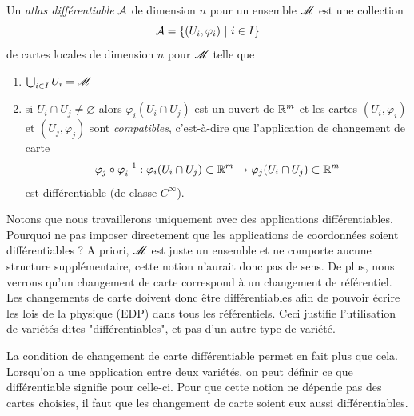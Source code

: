 \documentclass[a4paper,11pt]{report}
\begin{document}
            \begin{definition}
                Un \textit{atlas différentiable} $\mathcal{A}$ de dimension $n$ pour un ensemble $\mathscr{M}$ est une collection 
                \begin{equation}
                    \mathcal{A} = \left\{ (U_i,\varphi_i)~|~i\in I \right\}
                \end{equation}
                de cartes locales de dimension $n$ pour $\mathscr{M}$ telle que
                \begin{enumerate}[label=\textit{(\roman*)}]
                    \item $\bigcup_{i\in I} U_i = \mathscr{M}$
                    \item si $U_i\cap U_j \neq \varnothing$ alors $\varphi_i(U_i\cap U_j)$ est un ouvert de $\mathbb{R}^m$ et les cartes $(U_i,\varphi_i)$ et $(U_j,\varphi_j)$ sont \textit{compatibles}, c'est-à-dire que l'application de changement de carte
                        \begin{equation}
                            \varphi_j\circ\varphi_i^{-1}:\varphi_i(U_i\cap U_j)\subset\mathbb{R}^m\to\varphi_j(U_i\cap U_j)\subset\mathbb{R}^m
                        \end{equation}
                        est différentiable (de classe $C^\infty$).
                \end{enumerate}
            \end{definition}
            
            Notons que nous travaillerons uniquement avec des applications différentiables. Pourquoi ne pas imposer directement que les applications de coordonnées soient différentiables ? A priori, $\mathscr{M}$ est juste un ensemble et ne comporte aucune structure supplémentaire, cette notion n'aurait donc pas de sens. De plus, nous verrons qu'un changement de carte correspond à un changement de référentiel. Les changements de carte doivent donc être différentiables afin de pouvoir écrire les lois de la physique (EDP) dans tous les référentiels. Ceci justifie l'utilisation de variétés dites "différentiables", et pas d'un autre type de variété.
            
            \begin{rmk}
                La condition de changement de carte différentiable permet en fait plus que cela. Lorsqu'on a une application entre deux variétés, on peut définir ce que différentiable signifie pour celle-ci. Pour que cette notion ne dépende pas des cartes choisies, il faut que les changement de carte soient eux aussi différentiables.
            \end{rmk}
            
\end{document}
